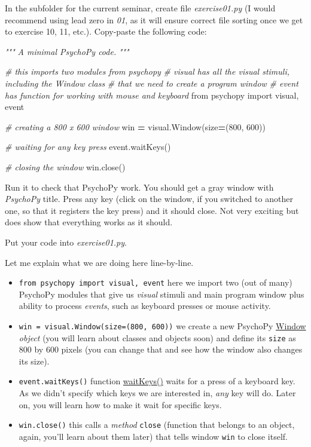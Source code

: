 \documentclass[
]{book}
\newenvironment{Shaded}{\begin{snugshade}}{\end{snugshade}}
\newcommand{\CommentTok}[1]{\textcolor[rgb]{0.56,0.35,0.01}{\textit{#1}}}
\newcommand{\DecValTok}[1]{\textcolor[rgb]{0.00,0.00,0.81}{#1}}
\newcommand{\ImportTok}[1]{#1}
\newcommand{\NormalTok}[1]{#1}
\newcommand{\OperatorTok}[1]{\textcolor[rgb]{0.81,0.36,0.00}{\textbf{#1}}}
\providecommand{\tightlist}{%
  \setlength{\itemsep}{0pt}\setlength{\parskip}{0pt}}
\begin{document}
In the subfolder for the current seminar, create file \emph{exercise01.py} (I would recommend using lead zero in \emph{01}, as it will ensure correct file sorting once we get to exercise 10, 11, etc.). Copy-paste the following code:

\begin{Shaded}
\begin{Highlighting}[]
\CommentTok{"""}
\CommentTok{A minimal PsychoPy code.}
\CommentTok{"""}

\CommentTok{\# this imports two modules from psychopy}
\CommentTok{\# visual has all the visual stimuli, including the Window class}
\CommentTok{\# that we need to create a program window}
\CommentTok{\# event has function for working with mouse and keyboard}
\ImportTok{from}\NormalTok{ psychopy }\ImportTok{import}\NormalTok{ visual, event}

\CommentTok{\# creating a 800 x 600 window}
\NormalTok{win }\OperatorTok{=}\NormalTok{ visual.Window(size}\OperatorTok{=}\NormalTok{(}\DecValTok{800}\NormalTok{, }\DecValTok{600}\NormalTok{))}

\CommentTok{\# waiting for any key press}
\NormalTok{event.waitKeys()}

\CommentTok{\# closing the window}
\NormalTok{win.close()}
\end{Highlighting}
\end{Shaded}

Run it to check that PsychoPy work. You should get a gray window with \emph{PsychoPy} title. Press any key (click on the window, if you switched to another one, so that it registers the key press) and it should close. Not very exciting but does show that everything works as it should.

Put your code into \emph{exercise01.py}.

Let me explain what we are doing here line-by-line.

\begin{itemize}
\tightlist
\item
  \texttt{from\ psychopy\ import\ visual,\ event} here we import two (out of many) PsychoPy modules that give us \emph{visual} stimuli and main program window plus ability to process \emph{events}, such as keyboard presses or mouse activity.
\item
  \texttt{win\ =\ visual.Window(size=(800,\ 600))} we create a new PsychoPy \href{https://psychopy.org/api/visual/window.html\#psychopy.visual.Window}{Window} \emph{object} (you will learn about classes and objects soon) and define its \texttt{size} as 800 by 600 pixels (you can change that and see how the window also changes its size).
\item
  \texttt{event.waitKeys()} function \href{https://psychopy.org/api/event.html\#psychopy.event.waitKeys}{waitKeys()} waits for a press of a keyboard key. As we didn't specify which keys we are interested in, \emph{any} key will do. Later on, you will learn how to make it wait for specific keys.
\item
  \texttt{win.close()} this calls a \emph{method} \texttt{close} (function that belongs to an object, again, you'll learn about them later) that tells window \texttt{win} to close itself.
\end{itemize}
\end{document}
